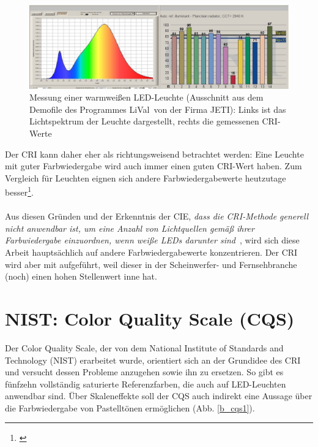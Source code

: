 \begin{figure}[htp]     %
\centering
\includegraphics[width=1.0\textwidth]{bilder/cri2} 
\caption {Messung einer warmweißen LED-Leuchte (Ausschnitt aus dem Demofile des Programmes \glqq LiVal\grqq\ von der Firma JETI): Links ist das Lichtspektrum der Leuchte dargestellt, rechts die gemessenen CRI-Werte  \protect\footnotemark}\label{b_cri2}
\end{figure}
\noindent Der CRI kann daher eher als richtungsweisend betrachtet werden: Eine Leuchte mit guter Farbwiedergabe wird auch immer einen guten CRI-Wert haben. 
Zum Vergleich für Leuchten eignen sich andere Farbwiedergabewerte heutzutage besser\footnote{\cite{production partner}}.\\\\
Aus diesen Gründen und der Erkenntnis der CIE, \emph{\glqq dass die CRI-Methode generell nicht anwendbar ist, um eine Anzahl von Lichtquellen gemäß ihrer Farbwiedergabe einzuordnen, wenn weiße LEDs darunter sind\grqq}\ \citep[VI]{CIE}, wird sich diese Arbeit hauptsächlich auf andere Farbwiedergabewerte konzentrieren. Der CRI wird aber mit aufgeführt, weil dieser in der Scheinwerfer- und Fernsehbranche (noch) einen hohen Stellenwert inne hat.



\section{NIST: Color Quality Scale (CQS)} \label{sec_cqs}

Der Color Quality Scale, der von dem National Institute of Standards and Technology (NIST) erarbeitet wurde, orientiert sich an der Grundidee des CRI und versucht dessen Probleme anzugehen sowie ihn zu ersetzen. So gibt es fünfzehn vollständig saturierte Referenzfarben, die auch auf LED-Leuchten anwendbar sind. Über Skaleneffekte soll der CQS auch indirekt eine Aussage über die Farbwiedergabe von Pastelltönen ermöglichen (Abb. \ref{b_cqs1}). 

